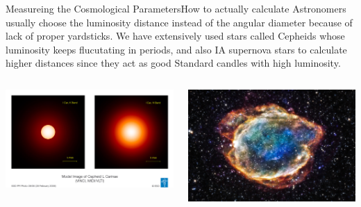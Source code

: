 \begin{frame}{Measureing the Cosmological Parameters}{How to actually calculate}
	Astronomers usually choose the  luminosity distance instead of the
	angular diameter because of lack of proper yardsticks. We have
	extensively used stars called Cepheids whose luminosity keeps
	flucutating in periods, and also IA supernova stars to calculate higher distances
	since they act as good Standard candles with high luminosity.

\begin{columns}[c]
        \begin{center}
            \includegraphics[width=\textwidth]{cepheid.png}
        \end{center}
        \begin{center}
             \includegraphics[width=\textwidth]{supernova.png}
        \end{center}
\end{columns}

\end{frame}

